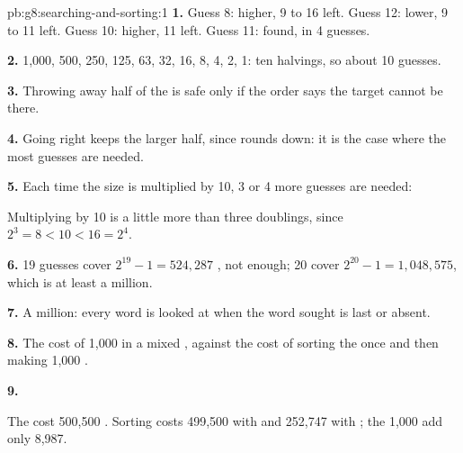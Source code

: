 \begin{solution}{pb:g8:searching-and-sorting:1}
\textbf{1.} Guess 8: higher, 9 to 16 left. Guess 12: lower, 9 to 11 left.
Guess 10: higher, 11 left. Guess 11: found, in 4 guesses.

\textbf{2.} 1,000, 500, 250, 125, 63, 32, 16, 8, 4, 2, 1: ten halvings, so
about 10 guesses.

\textbf{3.} Throwing away half of the  is safe only if the order says the
target cannot be there.

\textbf{4.} Going right keeps the larger half, since \code{//} rounds down:
it is the case where the most guesses are needed.

\textbf{5.} Each time the size is multiplied by 10, 3 or 4 more guesses are
needed:

\label{out:g8:searching-and-sorting:worst}

Multiplying by 10 is a little more than three doublings, since
$2^3 = 8 < 10 < 16 = 2^4$.

\textbf{6.} 19 guesses cover $2^{19} - 1 = 524{,}287$ , not enough;
20 cover $2^{20} - 1 = 1{,}048{,}575$, which is at least a million.

\textbf{7.} A million: every word is looked at when the word sought is last
or absent.

\textbf{8.} The cost of 1,000  in a mixed , against the
cost of sorting the  once and then making 1,000 .

\textbf{9.}

\label{out:g8:searching-and-sorting:sort-or-scan}

The  cost 500,500 . Sorting costs 499,500 with
 and 252,747 with ; the 1,000  add
only 8,987.


\end{solution}
